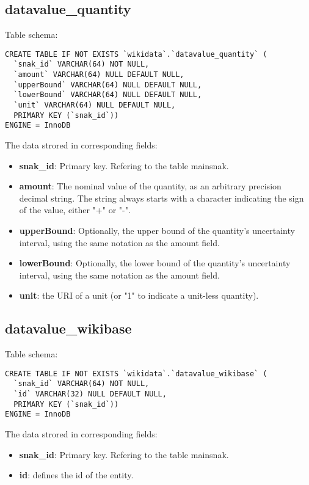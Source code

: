 \documentclass[12pt]{article}
\begin{document}
\subsection{datavalue\_quantity}
\lstset{language=SQL}
Table schema:
\begin{lstlisting}
CREATE TABLE IF NOT EXISTS `wikidata`.`datavalue_quantity` (
  `snak_id` VARCHAR(64) NOT NULL,
  `amount` VARCHAR(64) NULL DEFAULT NULL,
  `upperBound` VARCHAR(64) NULL DEFAULT NULL,
  `lowerBound` VARCHAR(64) NULL DEFAULT NULL,
  `unit` VARCHAR(64) NULL DEFAULT NULL,
  PRIMARY KEY (`snak_id`))
ENGINE = InnoDB
\end{lstlisting}
The data strored in corresponding fields:
\begin{itemize}
\item \textbf{snak\_id}: Primary key. Refering to the table mainsnak.
\item \textbf{amount}: The nominal value of the quantity, as an arbitrary precision decimal string. The string always starts with a character indicating the sign of the value, either "+" or "-".
\item \textbf{upperBound}: Optionally, the upper bound of the quantity's uncertainty interval, using the same notation as the amount field.
\item \textbf{lowerBound}: Optionally, the lower bound of the quantity's uncertainty interval, using the same notation as the amount field.
\item \textbf{unit}: the URI of a unit (or "1" to indicate a unit-less quantity).
\end{itemize}
\subsection{datavalue\_wikibase}
\lstset{language=SQL}
Table schema:
\begin{lstlisting}
CREATE TABLE IF NOT EXISTS `wikidata`.`datavalue_wikibase` (
  `snak_id` VARCHAR(64) NOT NULL,
  `id` VARCHAR(32) NULL DEFAULT NULL,
  PRIMARY KEY (`snak_id`))
ENGINE = InnoDB
\end{lstlisting}
The data strored in corresponding fields:
\begin{itemize}
\item \textbf{snak\_id}: Primary key. Refering to the table mainsnak.
\item \textbf{id}: defines the id of the entity.
\end{itemize}
\end{document}
